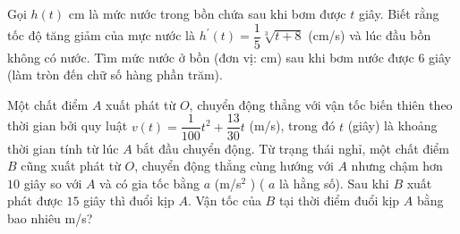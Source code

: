 \begin{ex}%
Gọi $h(t)$ cm là mức nước trong bồn chứa sau khi bơm được $t$ giây. Biết rằng tốc độ tăng giảm của mực nước là $h^{\prime}(t)=\dfrac{1}{5} \sqrt[3]{t+8}$ (cm/s) và lúc đầu bồn không có nước. Tìm mức nước ở bồn (đơn vị: cm) sau khi bơm nước được $6$ giây (làm tròn đến chữ số hàng phần trăm).
\end{ex}

\begin{ex}%
Một chất điểm $A$ xuất phát từ $O$, chuyển động thẳng với vận tốc biến thiên theo thời gian bởi quy luật $v \left(t\right) = \dfrac{1}{100}t^2 + \dfrac{13}{30}t$ (m/s), trong đó $t$ (giây) là khoảng thời gian tính từ lúc $A$ bắt đầu chuyển động. Từ trạng thái nghỉ, một chất điểm $B$ cũng xuất phát từ $O$, chuyển động thẳng cùng hướng với $A$ nhưng chậm hơn $10$ giây so với $A$ và có gia tốc bằng $a$ (m/s$^2$ ) ( $a$ là hằng số). Sau khi $B$ xuất phát được $15$ giây thì đuổi kịp $A$. Vận tốc của $B$ tại thời điểm đuổi kịp $A$ bằng bao nhiêu m/s?
\end{ex}

